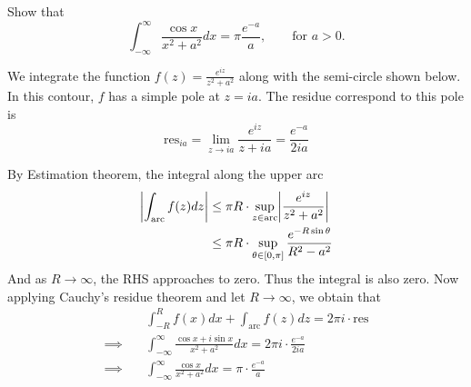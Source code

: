 \begin{problem}[Stien, Ex 3, p. 103]
	Show that
  \[
    \int_{-\infty}^{\infty}\frac{\cos x}{x^2+a^2}dx =
    \pi\frac{e^{-a}}{a},\qquad \text{for $a>0$.}
  \]
\end{problem}
\begin{solution}
	We integrate the function $f(z)=\frac{e^{iz}}{z^2+a^2}$ along with the semi-circle
  shown below. In this contour, $f$ has a simple pole at $z=ia$. The residue correspond
  to this pole is
  \[
    \text{res}_{ia} = \lim_{z\to ia}\frac{e^{iz}}{z+ia}=\frac{e^{-a}}{2ia}
  \]

  \begin{center}
  \end{center}
  By Estimation theorem, the integral along the upper arc
  \begin{align*}
    \abs*{\int_{\text{arc}} f(z)dz }
    &\leq \pi R\cdot\sup_{z\in\text{arc}}\abs*{\frac{e^{iz}}{z^2+a^2}}\\
    &\leq \pi R\cdot\sup_{\theta\in[0,\pi]}\frac{e^{-R\sin\theta}}{R^2-a^2}
  \end{align*}
  And as $R\to\infty$, the RHS approaches to zero. Thus the integral is also zero.
  Now applying Cauchy's residue theorem and let $R\to\infty$, we obtain that
  \begin{align*}
    &\int_{-R}^{R}f(x)dx + \int_{\text{arc}}f(z)dz = 2\pi i\cdot\text{res}\\\implies\quad
    &\int_{-\infty}^{\infty}\frac{\cos x+i\sin x}{x^2+a^2} dx = 2\pi i\cdot\frac{e^{-a}}{2ia}\\
    \implies\quad
    &\int_{-\infty}^{\infty}\frac{\cos x}{x^2+a^2}dx = \pi\cdot\frac{e^{-a}}{a}
  \end{align*}
\end{solution}


